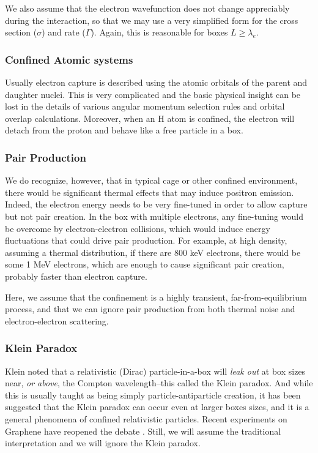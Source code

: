 \documentclass[%
 aip,
 jmp,%
 amsmath,amssymb,
 reprint,%
]{revtex4-1}
\begin{document}
We also assume that the electron wavefunction does not change appreciably during the interaction, so that we may use a very simplified form for the cross section ($\sigma$) and rate ($\Gamma$).  Again, this is reasonable for boxes $L\ge\lambda_{e}$.


\subsubsection{Confined Atomic systems}

Usually electron capture is described using the atomic orbitals of the parent and daughter nuclei.\cite{ec-review1,ec-review2}  This is very complicated and the basic physical insight can be lost in the details of various angular momentum selection rules and orbital overlap calculations.  Moreover, when an H atom is confined, the electron will detach from the proton and behave like a free particle in a box.\cite{Sen}  


\subsubsection{Pair Production}

We do recognize, however, that in typical cage or other confined environment, there would be significant thermal effects that may induce positron emission.  Indeed, the electron energy needs to be very fine-tuned in order to allow capture but not pair creation.  In the box with multiple electrons, any fine-tuning would be overcome by electron-electron collisions, which would induce energy fluctuations that could drive  pair production.  For example, at high density, assuming a thermal distribution, if there are 800 keV electrons, there would be some 1 MeV electrons, which are enough to cause significant pair creation, probably faster than electron capture.  

Here, we assume that the confinement is a highly transient, far-from-equilibrium process, and that we can ignore pair production from both thermal noise and electron-electron scattering. 

\subsubsection{Klein Paradox}

Klein noted that a relativistic (Dirac) particle-in-a-box will \emph{leak out} at box sizes near, \emph{or above}, the Compton wavelength--this called the Klein paradox. \cite{klein1,klein2}  And while this is usually taught as being simply particle-antiparticle creation, it has been suggested that the Klein paradox can occur even at larger boxes sizes, and it is a general phenomena of confined relativistic particles.  Recent experiments on Graphene have reopened the debate \cite{klein3}. Still, we will assume the traditional interpretation and we will ignore the Klein paradox.
\end{document}
